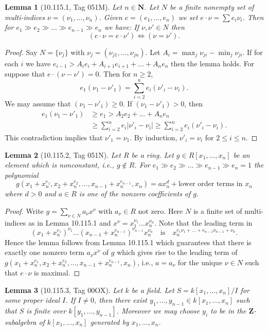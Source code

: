 \documentclass[UTF8,11pt]{ctexart}
\newtheorem*{lemma}{Lemma}
\theoremstyle{definition}
\begin{document}
\begin{lemma}[10.115.1, Tag 051M]
Let $n\in\mathbf N$. Let $N$ be a finite nonempty set of multi-indices $\nu=(\nu_1,\ldots,\nu_n)$. Given $e=(e_1,\ldots,e_n)$ we set $e\cdot\nu=\sum e_i\nu_i$. Then for $e_1\gg e_2\gg\ldots\gg e_{n-1}\gg e_n$ we have: If $\nu,\nu'\in N$ then
\[
(e\cdot\nu=e\cdot\nu')\Longleftrightarrow(\nu=\nu').
\]
\end{lemma}
\begin{proof}
Say $N=\{\nu_j\}$ with $\nu_j=(\nu_{j1},\ldots,\nu_{jn})$. Let $A_i=\max_j\nu_{ji}-\min_j\nu_{ji}$. If for each $i$ we have $e_{i-1}>A_ie_i+A_{i+1}e_{i+1}+\ldots+A_ne_n$ then the lemma holds. For suppose that $e\cdot(\nu-\nu')=0$. Then for $n\geq2$,
\[
e_1(\nu_1-\nu'_1)=\sum_{i=2}^n e_i(\nu'_i-\nu_i).
\]
We may assume that $(\nu_1-\nu'_1)\geq0$. If $(\nu_1-\nu'_1)>0$, then
\begin{align*}
e_1(\nu_1-\nu'_1)&\geq e_1>A_2e_2+\ldots+A_ne_n\\
&\geq\sum_{i=2}^n e_i|\nu'_i-\nu_i|\geq\sum_{i=2}^n e_i(\nu'_i-\nu_i).
\end{align*}
This contradiction implies that $\nu'_1=\nu_1$. By induction, $\nu'_i=\nu_i$ for $2\leq i\leq n$.
\end{proof}
\begin{lemma}[10.115.2, Tag 051N]
Let $R$ be a ring. Let $g\in R[x_1,\ldots,x_n]$ be an element which is nonconstant, i.e., $g\notin R$. For $e_1\gg e_2\gg\ldots\gg e_{n-1}\gg e_n=1$ the polynomial
\[
g(x_1+x_n^{e_1},x_2+x_n^{e_2},\ldots,x_{n-1}+x_n^{e_{n-1}},x_n)
=ax_n^d+\text{lower order terms in }x_n
\]
where $d>0$ and $a\in R$ is one of the nonzero coefficients of $g$.
\end{lemma}
\begin{proof}
Write $g=\sum_{\nu\in N}a_\nu x^\nu$ with $a_\nu\in R$ not zero. Here $N$ is a finite set of multi-indices as in Lemma 10.115.1 and $x^\nu=x_1^{\nu_1}\ldots x_n^{\nu_n}$. Note that the leading term in
\[
(x_1+x_n^{e_1})^{\nu_1}\ldots(x_{n-1}+x_n^{e_{n-1}})^{\nu_{n-1}}x_n^{\nu_n}
\quad\text{is}\quad x_n^{e_1\nu_1+\ldots+e_{n-1}\nu_{n-1}+\nu_n}.
\]
Hence the lemma follows from Lemma 10.115.1 which guarantees that there is exactly one nonzero term $a_\nu x^\nu$ of $g$ which gives rise to the leading term of $g(x_1+x_n^{e_1},x_2+x_n^{e_2},\ldots,x_{n-1}+x_n^{e_{n-1}},x_n)$, i.e., $a=a_\nu$ for the unique $\nu\in N$ such that $e\cdot\nu$ is maximal.
\end{proof}
\begin{lemma}[10.115.3, Tag 00OX]
Let $k$ be a field. Let $S=k[x_1,\ldots,x_n]/I$ for some proper ideal $I$. If $I\neq0$, then there exist $y_1,\ldots,y_{n-1}\in k[x_1,\ldots,x_n]$ such that $S$ is finite over $k[y_1,\ldots,y_{n-1}]$. Moreover we may choose $y_i$ to be in the $\mathbf Z$-subalgebra of $k[x_1,\ldots,x_n]$ generated by $x_1,\ldots,x_n$.
\end{lemma}
\end{document}
